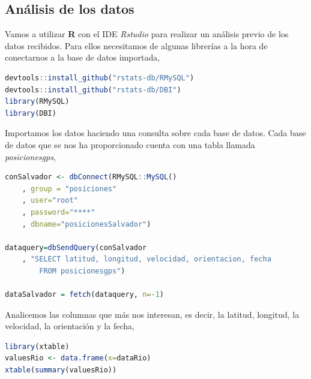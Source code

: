 \documentclass[a4paper, 12pt]{article}
\begin{document}
\smallskip


\pagebreak
\subsection{An\'alisis de los datos}

Vamos a utilizar \textbf{R} con el IDE \textit{Rstudio} para realizar un an\'alisis previo de los datos recibidos. Para ellos necesitamos de algunas librer\'ias a la hora de conectarnos a la base de datos importada,\\

\begin{lstlisting}[language=R, columns=fullflexible, basicstyle=\small, frame=tblr]
devtools::install_github("rstats-db/RMySQL")
devtools::install_github("rstats-db/DBI")
library(RMySQL)
library(DBI)
\end{lstlisting}

Importamos los datos haciendo una consulta sobre cada base de datos. Cada base de datos que se nos ha proporcionado cuenta con una tabla llamada \textit{posicionesgps},\\

\begin{lstlisting}[language=R, columns=fullflexible, basicstyle=\small,frame=tbrl, showstringspaces=false]
conSalvador <- dbConnect(RMySQL::MySQL()
	, group = "posiciones"
	, user="root"
	, password="****"
	, dbname="posicionesSalvador")

dataquery=dbSendQuery(conSalvador
	, "SELECT latitud, longitud, velocidad, orientacion, fecha 
		FROM posicionesgps")

dataSalvador = fetch(dataquery, n=-1)
\end{lstlisting}

Analicemos las columnas que m\'as nos interesan, es decir, la latitud, longitud, la velocidad, la orientaci\'on y la fecha, \\

\begin{lstlisting}[language=R, basicstyle=\small, columns=fullflexible, frame=tbrl, showstringspaces=false]
library(xtable)
valuesRio <- data.frame(x=dataRio)
xtable(summary(valuesRio))
\end{lstlisting}

\bigskip 
\end{document}
